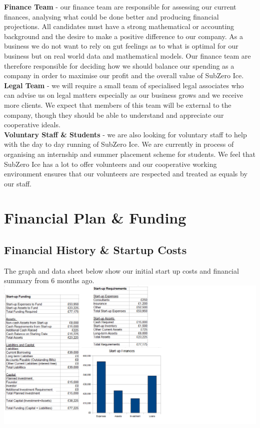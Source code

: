\documentclass{article}
\begin{document}
  {\bf Finance Team} - our finance team are responsible for assessing our current finances, analysing what could be done better and producing financial projections. All candidates must have a strong mathematical or accounting background and the desire to make a positive difference to our company. As a business we do not want to rely on gut feelings as to what is optimal for our business but on real world data and mathematical models. Our finance team are therefore responsible for deciding how we should balance our spending as a company in order to maximise our profit and the overall value of SubZero Ice. \\

  {\bf Legal Team} - we will require a small team of specialised legal associates who can advise us on legal matters especially as our business grows and we receive more clients. We expect that members of this team will be external to the company, though they should be able to understand and appreciate our cooperative ideals. \\

  {\bf Voluntary Staff \& Students} - we are also looking for voluntary staff to help with the day to day running of SubZero Ice. We are currently in process of organising an internship and summer placement scheme for students. We feel that SubZero Ice has a lot to offer volunteers and our cooperative working environment ensures that our volunteers are respected and treated as equals by our staff.


\section{Financial Plan \& Funding}

\subsection{Financial History \& Startup Costs}

The graph and data sheet below show our initial start up costs and financial summary from 6 months ago. \\

\includegraphics[scale=0.7]{startupFinanceData.png}
\end{document}
